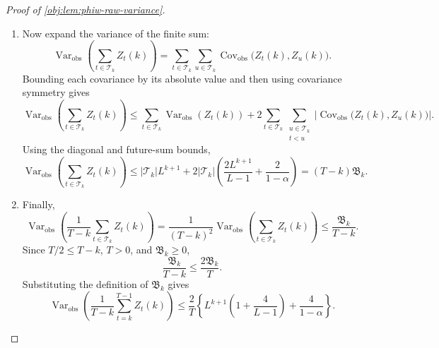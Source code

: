 \begin{proof}[Proof of \cref{obj:lem:phiw-raw-variance}]
\begin{enumerate}
\item
Now expand the variance of the finite sum:
\[
\operatorname{Var}_{\mathrm{obs}}\!\left(\sum_{t\in\mathscr T_k}Z_t(k)\right)
=
\sum_{t\in\mathscr T_k}\sum_{u\in\mathscr T_k}
\operatorname{Cov}_{\mathrm{obs}}\bigl(Z_t(k),Z_u(k)\bigr).
\]
Bounding each covariance by its absolute value and then using covariance symmetry gives
\[
\operatorname{Var}_{\mathrm{obs}}\!\left(\sum_{t\in\mathscr T_k}Z_t(k)\right)
\le
\sum_{t\in\mathscr T_k}\operatorname{Var}_{\mathrm{obs}}(Z_t(k))
+
2\sum_{t\in\mathscr T_k}
\sum_{\substack{u\in\mathscr T_k\\ t<u}}
\left|\operatorname{Cov}_{\mathrm{obs}}\bigl(Z_t(k),Z_u(k)\bigr)\right|.
\]
Using the diagonal and future-sum bounds,
\[
\operatorname{Var}_{\mathrm{obs}}\!\left(\sum_{t\in\mathscr T_k}Z_t(k)\right)
\le
|\mathscr T_k|L^{k+1}
+
2|\mathscr T_k|
\left(
\frac{2L^{k+1}}{L-1}
+
\frac{2}{1-\alpha}
\right)
=
(T-k)\mathfrak B_k.
\]

\item
Finally,
\[
\operatorname{Var}_{\mathrm{obs}}\!\left(
\frac{1}{T-k}\sum_{t\in\mathscr T_k}Z_t(k)
\right)
=
\frac{1}{(T-k)^2}
\operatorname{Var}_{\mathrm{obs}}\!\left(\sum_{t\in\mathscr T_k}Z_t(k)\right)
\le
\frac{\mathfrak B_k}{T-k}.
\]
Since \(T/2\le T-k\), \(T>0\), and \(\mathfrak B_k\ge0\),
\[
\frac{\mathfrak B_k}{T-k}
\le
\frac{2\mathfrak B_k}{T}.
\]
Substituting the definition of \(\mathfrak B_k\) gives
\[
\operatorname{Var}_{\mathrm{obs}}\!\left(\frac{1}{T-k}\sum_{t=k}^{T-1} Z_t(k)\right)
\le
\frac{2}{T}\left\{
L^{k+1}\left(1+\frac{4}{L-1}\right)
+
\frac{4}{1-\alpha}
\right\}.
\]
\end{enumerate}
\end{proof}
